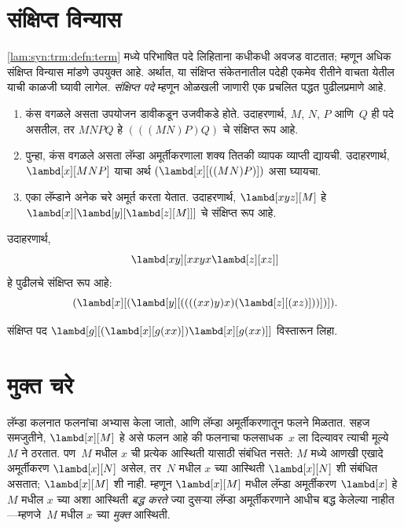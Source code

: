 \section{संक्षिप्त विन्यास}\label{lam:syn:abb:sec}

\ref{lam:syn:trm:defn:term} मध्ये परिभाषित पदे लिहिताना
कधीकधी अवजड वाटतात; म्हणून अधिक संक्षिप्त विन्यास
मांडणे उपयुक्त आहे. अर्थात, या संक्षिप्त संकेतनातील
पदेही एकमेव रीतीने वाचता येतील याची काळजी
घ्यावी लागेल. \emph{संक्षिप्त पदे} म्हणून ओळखली
जाणारी एक प्रचलित पद्धत पुढीलप्रमाणे आहे.

\begin{enumerate}
\item कंस वगळले असता उपयोजन डावीकडून उजवीकडे
  होते. उदाहरणार्थ, $M$, $N$, $P$ आणि~$Q$
  ही पदे असतील, तर $MNPQ$ हे $(((MN)P)Q)$
  चे संक्षिप्त रूप आहे.
\item पुन्हा, कंस वगळले असता लॅम्डा अमूर्तीकरणाला
  शक्य तितकी व्यापक व्याप्ती द्यायची. उदाहरणार्थ,
  $\lambd[x][MNP]$ याचा अर्थ
  $(\lambd[x][((MN)P)])$ असा घ्यायचा.
\item एका लॅम्डाने अनेक चरे अमूर्त करता येतात.
  उदाहरणार्थ, $\lambd[xyz][M]$ हे
  $\lambd[x][\lambd[y][\lambd[z][M]]]$
  चे संक्षिप्त रूप आहे.
\end{enumerate}

उदाहरणार्थ,
\[\lambd[xy][xxyx \lambd[z][xz]]
\]
हे पुढीलचे संक्षिप्त रूप आहे:
\[(\lambd[x][(\lambd[y][((((xx)y)x)(\lambd[z][(xz)]))])]).
\]

\begin{prob}
संक्षिप्त पद
$\lambd[g][(\lambd[x][g (x x)])
  \lambd[x][g (x x)]]$
विस्तारून लिहा.
\end{prob}











\section{मुक्त चरे}\label{lam:syn:fv:sec}

लॅम्डा कलनात फलनांचा अभ्यास केला जातो, आणि लॅम्डा अमूर्तीकरणातून
फलने मिळतात. सहज समजुतीने, $\lambd[x][M]$ हे असे फलन आहे की
फलनाचा फलसाधक~$x$ ला दिल्यावर त्याची मूल्ये~$M$ ने
ठरतात. पण~$M$ मधील $x$ ची प्रत्येक आस्थिती यासाठी संबंधित नसते:
$M$ मध्ये आणखी एखादे अमूर्तीकरण $\lambd[x][N]$ असेल, तर~$N$
मधील $x$ च्या आस्थिती $\lambd[x][N]$ शी संबंधित असतात;
$\lambd[x][M]$ शी नाही. म्हणून $\lambd[x][M]$ मधील
लॅम्डा अमूर्तीकरण $\lambd[x]$ हे~$M$ मधील $x$ च्या अशा
आस्थिती \emph{बद्ध करते} ज्या दुसऱ्या लॅम्डा अमूर्तीकरणाने
आधीच बद्ध केलेल्या नाहीत---म्हणजे~$M$ मधील $x$ च्या
\emph{मुक्त} आस्थिती.

